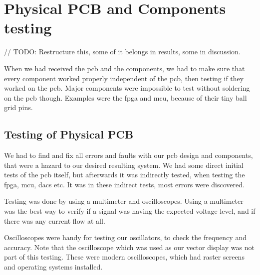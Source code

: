 \section{Physical PCB and Components testing}

// TODO: Restructure this, some of it belongs in results, some in discussion.

When we had received the \gls{pcb} and the components, we had to make sure that every component worked properly independent of the \gls{pcb}, then testing if they worked on the \gls{pcb}. Major components were impossible to test without soldering on the \gls{pcb} though. Examples were the \gls{fpga} and \gls{mcu}, because of their tiny ball grid pins.

\subsection{Testing of Physical PCB}
We had to find and fix all errors and faults with our \gls{pcb} design and components, that were a hazard to our desired resulting system.  
We had some direct initial tests of the \gls{pcb} itself, but afterwards it was indirectly tested, when testing the \gls{fpga}, \gls{mcu}, \gls{dac}s etc. It was in these indirect tests, most errors were discovered.

Testing was done by using a multimeter and oscilloscopes. Using a multimeter was the best way to verify if a signal was having the expected voltage level, and if there was any current flow at all.

Oscilloscopes were handy for testing our oscillators, to check the frequency and accuracy. Note that the oscilloscope which was used as our vector display was not part of this testing. These were modern oscilloscopes, which had raster screens and operating systems installed.

